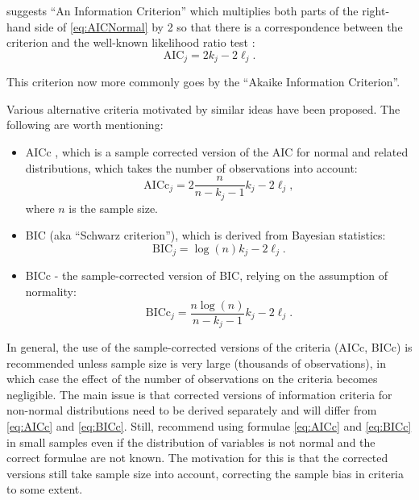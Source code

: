 \documentclass[
]{book}
\theoremstyle{definition}
\theoremstyle{definition}
\theoremstyle{definition}
\theoremstyle{definition}
\theoremstyle{remark}
\begin{document}
\citet{Akaike1974} suggests ``An Information Criterion'' which multiplies both parts of the right-hand side of \eqref{eq:AICNormal} by 2 so that there is a correspondence between the criterion and the well-known likelihood ratio test \citep{WikipediaLikelihoodRatioTest2020}:
\begin{equation}
    \mathrm{AIC}_j = 2 k_j - 2 \ell_j
    \label{eq:AIC}.
\end{equation}

This criterion now more commonly goes by the ``Akaike Information Criterion''.

Various alternative criteria motivated by similar ideas have been proposed. The following are worth mentioning:

\begin{itemize}
\item
  AICc \citep{Sugiura1978}, which is a sample corrected version of the AIC for normal and related distributions, which takes the number of observations into account:
  \begin{equation}
    \mathrm{AICc}_j = 2 \frac{n}{n-k_j-1} k_j - 2 \ell_j
    \label{eq:AICc},
  \end{equation}
  where \(n\) is the sample size.
\item
  BIC \citep{Schwarz1978} (aka ``Schwarz criterion''), which is derived from Bayesian statistics:
  \begin{equation}
    \mathrm{BIC}_j = \log(n) k_j - 2 \ell_j
    \label{eq:BIC}.
  \end{equation}
\item
  BICc \citep{McQuarrie1999} - the sample-corrected version of BIC, relying on the assumption of normality:
  \begin{equation}
    \mathrm{BICc}_j = \frac{n \log (n)}{n-k_j-1} k_j - 2 \ell_j
    \label{eq:BICc}.
  \end{equation}
\end{itemize}

In general, the use of the sample-corrected versions of the criteria (AICc, BICc) is recommended unless sample size is very large (thousands of observations), in which case the effect of the number of observations on the criteria becomes negligible. The main issue is that corrected versions of information criteria for non-normal distributions need to be derived separately and will differ from \eqref{eq:AICc} and \eqref{eq:BICc}. Still, \citet{Burnham2004} recommend using formulae \eqref{eq:AICc} and \eqref{eq:BICc} in small samples even if the distribution of variables is not normal and the correct formulae are not known. The motivation for this is that the corrected versions still take sample size into account, correcting the sample bias in criteria to some extent.
\end{document}
